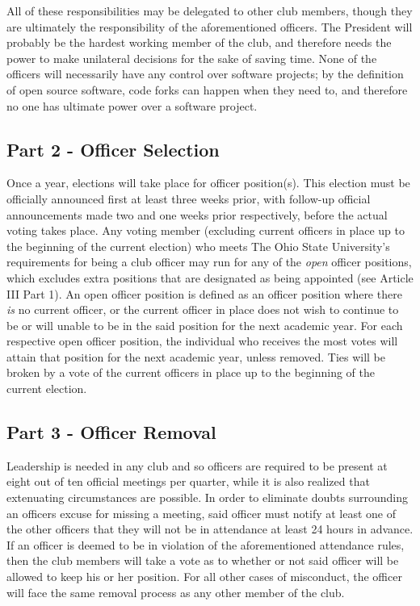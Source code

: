 \documentclass{article}
\begin{document}
	All of these responsibilities may be delegated to other club members, though they are ultimately the responsibility of the aforementioned officers.  The President will probably be the hardest working member of the club, and therefore needs the power to make unilateral decisions for the sake of saving time.  None of the officers will necessarily have any control over software projects; by the definition of open source software, code forks can happen when they need to, and therefore no one has ultimate power over a software project.

	\subsection{Part 2 - Officer Selection}

	Once a year, elections will take place for officer position(s).  This election must be officially announced first at least three weeks prior, with follow-up official announcements made two and one weeks prior respectively, before the actual voting takes place.  Any voting member (excluding current officers in place up to the beginning of the current election) who meets The Ohio State University's requirements for being a club officer may run for any of the \textit{open} officer positions, which excludes extra positions that are designated as being appointed (see Article III Part 1).  An open officer position is defined as an officer position where there \textit{is} no current officer, or the current officer in place does not wish to continue to be or will unable to be in the said position for the next academic year.  For each respective open officer position, the individual who receives the most votes will attain that position for the next academic year, unless removed.  Ties will be broken by a vote of the current officers in place up to the beginning of the current election.

	\subsection{Part 3 - Officer Removal}

	Leadership is needed in any club and so officers are required to be present at eight out of ten official meetings per quarter, while it is also realized that extenuating circumstances are possible.  In order to eliminate doubts surrounding an officers excuse for missing a meeting, said officer must notify at least one of the other officers that they will not be in attendance at least 24 hours in advance.  If an officer is deemed to be in violation of the aforementioned attendance rules, then the club members will take a vote as to whether or not said officer will be allowed to keep his or her position. For all other cases of misconduct, the officer will face the same removal process as any other member of the club.
\end{document}
